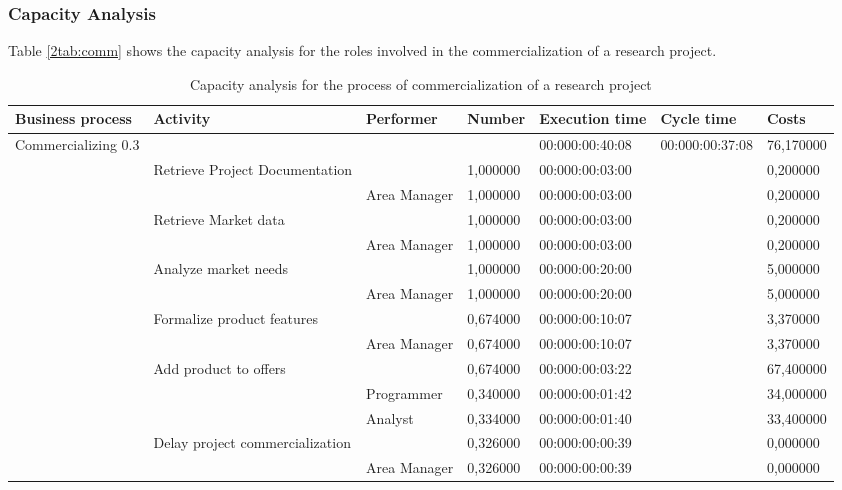 \subsubsection{Capacity Analysis}
Table \ref{2tab:comm} shows the capacity analysis for the roles involved in
the commercialization of a research project.
\begin{landscape}
\centering
\begin{table}
{\tiny
\begin{tabular}{|l|l|l|l|l|l|l|}
Business process&Activity&Performer&Number&Execution time&Cycle
time&Costs\\
\hline
Commercializing 0.3&&&&00:000:00:40:08&00:000:00:37:08&76,170000\\
\hline
&Retrieve Project Documentation &&1,000000&00:000:00:03:00&&0,200000\\
\hline
&&Area Manager &1,000000&00:000:00:03:00&&0,200000\\
\hline
&Retrieve Market data &&1,000000&00:000:00:03:00&&0,200000\\
\hline
&&Area Manager &1,000000&00:000:00:03:00&&0,200000\\
\hline
&Analyze market needs &&1,000000&00:000:00:20:00&&5,000000\\
\hline
&&Area Manager &1,000000&00:000:00:20:00&&5,000000\\
\hline
&Formalize product features &&0,674000&00:000:00:10:07&&3,370000\\
\hline
&&Area Manager &0,674000&00:000:00:10:07&&3,370000\\
\hline
&Add product to offers &&0,674000&00:000:00:03:22&&67,400000\\
\hline
&&Programmer &0,340000&00:000:00:01:42&&34,000000\\
\hline
&&Analyst &0,334000&00:000:00:01:40&&33,400000\\
\hline
&Delay project commercialization &&0,326000&00:000:00:00:39&&0,000000\\
\hline
&&Area Manager &0,326000&00:000:00:00:39&&0,000000\\
\hline
\end{tabular}
}
\caption{Capacity analysis for the process of commercialization of a
research project}
\label{2tab:commerc}
\end{table}
\end{landscape}



